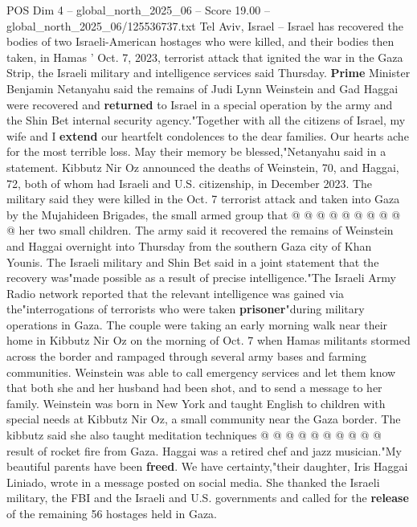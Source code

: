 \begin{textsample}{POS Dim 4 – global\_north\_2025\_06 – Score 19.00 – global\_north\_2025\_06/125536737.txt}  \label{ex:f4_pos_397}
Tel Aviv, Israel -- Israel has recovered the bodies of two Israeli-American hostages who were killed, and their bodies then taken, in Hamas ' Oct. 7, 2023, terrorist attack that ignited the war in the Gaza Strip, the Israeli military and intelligence services said Thursday. \textbf{Prime} Minister Benjamin Netanyahu said the remains of Judi Lynn Weinstein and Gad Haggai were recovered and \textbf{returned} to Israel in a special operation by the army and the Shin Bet internal security agency."Together with all the citizens of Israel, my wife and I \textbf{extend} our heartfelt condolences to the dear families.
Our hearts ache for the most terrible loss.
May their memory be blessed,"Netanyahu said in a statement.
Kibbutz Nir Oz announced the deaths of Weinstein, 70, and Haggai, 72, both of whom had Israeli and U.S. citizenship, in December 2023.
The military said they were killed in the Oct. 7 terrorist attack and taken into Gaza by the Mujahideen Brigades, the small armed group that @ @ @ @ @ @ @ @ @ @ her two small children.
The army said it recovered the remains of Weinstein and Haggai overnight into Thursday from the southern Gaza city of Khan Younis.
The Israeli military and Shin Bet said in a joint statement that the recovery was"made possible as a result of precise intelligence."The Israeli Army Radio network reported that the relevant intelligence was gained via the"interrogations of terrorists who were taken \textbf{prisoner}"during military operations in Gaza.
The couple were taking an early morning walk near their home in Kibbutz Nir Oz on the morning of Oct. 7 when Hamas militants stormed across the border and rampaged through several army bases and farming communities.
Weinstein was able to call emergency services and let them know that both she and her husband had been shot, and to send a message to her family.
Weinstein was born in New York and taught English to children with special needs at Kibbutz Nir Oz, a small community near the Gaza border.
The kibbutz said she also taught meditation techniques @ @ @ @ @ @ @ @ @ @ result of rocket fire from Gaza.
Haggai was a retired chef and jazz musician."My beautiful parents have been \textbf{freed}.
We have certainty,"their daughter, Iris Haggai Liniado, wrote in a message posted on social media.
She thanked the Israeli military, the FBI and the Israeli and U.S. governments and called for the \textbf{release} of the remaining 56 hostages held in Gaza.

\end{textsample}
